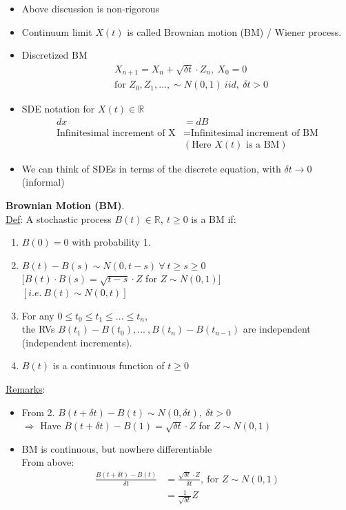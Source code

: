 \documentclass[12pt, letterpaper]{article}
\begin{document}
\begin{itemize}
    \item Above discussion is non-rigorous
    \item Continuum limit $X(t)$ is called Brownian motion (BM) / Wiener process.
    \item Discretized BM
    \begin{align*}
        &X_{n+1} = X_n + \sqrt{\delta t} \cdot Z_n,\ X_0 = 0 \\ 
        & \text{for } Z_0, Z_1, \dots, \sim N(0,1)\ iid,\ \delta t > 0
    \end{align*}
    \item SDE notation for $X(t) \in \mathbb{R}$
    \begin{align*}
        dx &= dB \\
        \text{Infinitesimal increment of X} &= \text{Infinitesimal increment of BM} \\
        &(\text{Here } X(t) \text{ is a BM})
    \end{align*}
    \item We can think of SDEs in terms of the discrete equation, with $\delta t \rightarrow 0$ (informal)
\end{itemize}
\textbf{Brownian Motion (BM)}. \\
\underline{Def}: A stochastic process $B(t) \in \mathbb{R},\ t \ge 0$ is a BM if:
\begin{enumerate}
    \item $B(0) = 0$ with probability 1.
    \item $B(t) - B(s) \sim N(0,t-s)\ \forall\ t \ge s \ge 0$ \\
    $[B(t) \cdot B(s) = \sqrt{t-s} \cdot Z$ for $Z\sim N(0,1)]$ \\
    $[i.e.\ B(t) \sim N(0,t)]$
    \item For any $0 \le t_0 \le t_1 \le ... \le t_n$, \\ the RVs $B(t_1) - B(t_0),...\ , B(t_n) - B(t_{n-1})$
    are independent (independent increments).
    \item $B(t)$ is a continuous function of $t\ge 0$
\end{enumerate}
\underline{Remarks}: 
\begin{itemize}
    \item From 2. $B(t+\delta t) - B(t) \sim N(0,\delta t),\ \delta t > 0$ \\
    $\Rightarrow$ Have $B(t+\delta t) - B(1) = \sqrt{\delta t} \cdot Z$ for $Z\sim N(0,1)$
    \item BM is continuous, but nowhere differentiable \\
    From above:
    \begin{align*}
        \frac{B(t+ \delta t) - B(t)}{\delta t} &= \frac{\sqrt{\delta t} \cdot Z}{\delta t},\ \text{for } Z \sim N(0,1) \\
        &= \frac 1{\sqrt{\delta t}} Z
    \end{align*}
\end{itemize}
\end{document}
